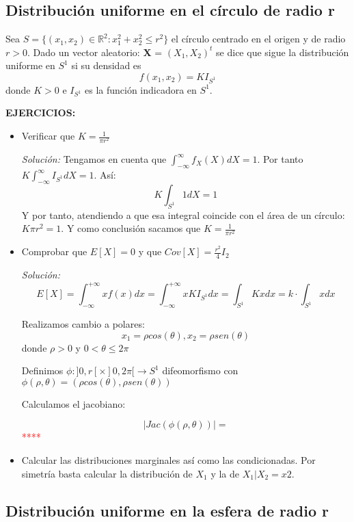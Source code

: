 \documentclass{article}
\theoremstyle{theorem-style}  %
\theoremstyle{definition}
\theoremstyle{example-style}
\begin{document}
	\subsection{Distribución uniforme en el círculo de radio r}
	
	Sea $S=\{(x_1, x_2) \in \mathbb{R}^2: x_1^2+x_2^2 \leq r^2\}$ el círculo centrado en el origen y de radio $r>0$. Dado un vector aleatorio: \textbf{X} = $(X_1, X_2)^t$ se dice que sigue la distribución uniforme en $S^1$ si su densidad es $$f(x_1,x_2) = KI_{S^1}$$ donde $K>0$ e $I_{S^1}$ es la función indicadora en $S^1$.
	
	\textbf{EJERCICIOS:}
	
	\begin{itemize}
		\item Verificar que $K=\frac{1}{\pi r^2}$
		
		\textit{Solución:} Tengamos en cuenta que $\int_{-\infty}^{\infty} f_X(X) dX = 1$. Por tanto $K \int_{-\infty}^{\infty} I_{S^1} dX =1 $. Así: $$K \int_{S^1}^{}1dX = 1 $$ Y por tanto, atendiendo a que esa integral coincide con el área de un círculo: $K\pi r^2 = 1$. Y como conclusión sacamos que $K=\frac{1}{\pi r^2}$
		
		\item Comprobar que $E[X]=0$ y que $Cov[X] = \frac{r^2}{4}I_2$
		
		\textit{Solución:}
		$$E[X]=\int_{-\infty}^{+\infty}xf(x) dx = \int_{-\infty}^{+\infty}xKI_{S^1} dx = \int_{S^1}Kx dx = k \cdot \int_{S^1}x dx$$ 
		
		Realizamos cambio a polares:
		 $$x_1 = \rho cos(\theta), x_2 = \rho sen(\theta)$$
		donde $\rho>0$ y $0<\theta\leq2\pi$
		
		Definimos $\phi:]0,r[\times]0,2\pi[\longrightarrow S^1$ difeomorfismo con $\phi(\rho,\theta) = (\rho cos(\theta), \rho sen(\theta))$
		
		Calculamos el jacobiano:
		
		$$|Jac (\phi(\rho,\theta))|=$$ 
		\textcolor{red}{****}
		
		
		
		
		\item Calcular las distribuciones marginales así como las condicionadas. Por simetría basta calcular la distribución de $X_1$  y la de $X_1|X_2=x2$. 
		
		 
	\end{itemize} 
	
	
	\subsection{Distribución uniforme en la esfera de radio r}
	
\end{document}
